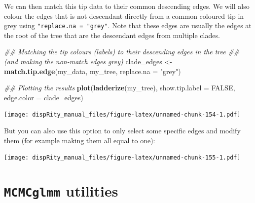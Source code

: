 \documentclass[
]{book}
\newenvironment{Shaded}{\begin{snugshade}}{\end{snugshade}}
\newcommand{\CommentTok}[1]{\textcolor[rgb]{0.56,0.35,0.01}{\textit{#1}}}
\newcommand{\DataTypeTok}[1]{\textcolor[rgb]{0.13,0.29,0.53}{#1}}
\newcommand{\DecValTok}[1]{\textcolor[rgb]{0.00,0.00,0.81}{#1}}
\newcommand{\KeywordTok}[1]{\textcolor[rgb]{0.13,0.29,0.53}{\textbf{#1}}}
\newcommand{\NormalTok}[1]{#1}
\newcommand{\OperatorTok}[1]{\textcolor[rgb]{0.81,0.36,0.00}{\textbf{#1}}}
\newcommand{\OtherTok}[1]{\textcolor[rgb]{0.56,0.35,0.01}{#1}}
\newcommand{\StringTok}[1]{\textcolor[rgb]{0.31,0.60,0.02}{#1}}
\begin{document}
We can then match this tip data to their common descending edges.
We will also colour the edges that is not descendant directly from a common coloured tip in grey using \texttt{"replace.na\ =\ "grey"}.
Note that these edges are usually the edges at the root of the tree that are the descendant edges from multiple clades.

\begin{Shaded}
\begin{Highlighting}[]
\CommentTok{\#\# Matching the tip colours (labels) to their descending edges in the tree}
\CommentTok{\#\# (and making the non{-}match edges grey)}
\NormalTok{clade\_edges \textless{}{-}}\StringTok{ }\KeywordTok{match.tip.edge}\NormalTok{(my\_data, my\_tree, }\DataTypeTok{replace.na =} \StringTok{"grey"}\NormalTok{)}

\CommentTok{\#\# Plotting the results}
\KeywordTok{plot}\NormalTok{(}\KeywordTok{ladderize}\NormalTok{(my\_tree), }\DataTypeTok{show.tip.label =} \OtherTok{FALSE}\NormalTok{, }\DataTypeTok{edge.color =}\NormalTok{ clade\_edges)}
\end{Highlighting}
\end{Shaded}

\texttt{[image: dispRity\_manual\_files/figure-latex/unnamed-chunk-154-1.pdf]}

But you can also use this option to only select some specific edges and modify them (for example making them all equal to one):

\begin{Shaded}
\end{Shaded}

\texttt{[image: dispRity\_manual\_files/figure-latex/unnamed-chunk-155-1.pdf]}

\hypertarget{MCMCglmm-utilities}{%
\section{\texorpdfstring{\texttt{MCMCglmm} utilities}{MCMCglmm utilities}}\label{MCMCglmm-utilities}}
\end{document}
